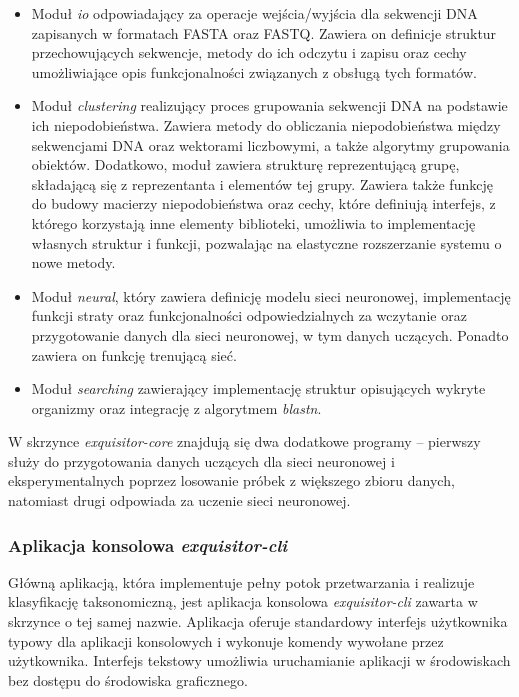             \begin{itemize}
                \item {
                    Moduł \textit{io} odpowiadający za operacje wejścia/wyjścia dla sekwencji DNA zapisanych w formatach FASTA oraz FASTQ. Zawiera on definicje struktur przechowujących sekwencje, metody do ich odczytu i zapisu oraz cechy umożliwiające opis funkcjonalności związanych z obsługą tych formatów.
                }
                \item {
                    Moduł \textit{clustering} realizujący proces grupowania sekwencji DNA na podstawie ich niepodobieństwa. Zawiera metody do obliczania niepodobieństwa między sekwencjami DNA oraz wektorami liczbowymi, a także algorytmy grupowania obiektów. Dodatkowo, moduł zawiera strukturę reprezentującą grupę, składającą się z reprezentanta i elementów tej grupy. Zawiera także funkcję do budowy macierzy niepodobieństwa oraz cechy, które definiują interfejs, z którego korzystają inne elementy biblioteki, umożliwia to implementację własnych struktur i funkcji, pozwalając na elastyczne rozszerzanie systemu o nowe metody.
                }
                \item {
                    Moduł \textit{neural}, który zawiera definicję modelu sieci neuronowej, implementację funkcji straty oraz funkcjonalności odpowiedzialnych za wczytanie oraz przygotowanie danych dla sieci neuronowej, w tym danych uczących. Ponadto zawiera on funkcję trenującą sieć.
                }
                \item {
                    Moduł \textit{searching} zawierający implementację struktur opisujących wykryte organizmy oraz integrację z algorytmem \textit{blastn}.
                }
            \end{itemize}

            W skrzynce \textit{exquisitor-core} znajdują się dwa dodatkowe programy – pierwszy służy do przygotowania danych uczących dla sieci neuronowej i eksperymentalnych poprzez losowanie próbek z większego zbioru danych, natomiast drugi odpowiada za uczenie sieci neuronowej.

        \subsubsection{Aplikacja konsolowa \textit{exquisitor-cli}}
            Główną aplikacją, która implementuje pełny potok przetwarzania i realizuje klasyfikację taksonomiczną, jest aplikacja konsolowa \textit{exquisitor-cli} zawarta w skrzynce o tej samej nazwie. Aplikacja oferuje standardowy interfejs użytkownika typowy dla aplikacji konsolowych i wykonuje komendy wywołane przez użytkownika. Interfejs tekstowy umożliwia uruchamianie aplikacji w środowiskach bez dostępu do środowiska graficznego.

